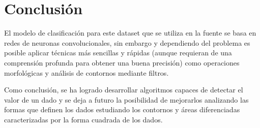 
\section{Conclusión}

El modelo de clasificación para este dataset que se utiliza en la fuente se basa en redes de neuronas convolucionales, sin embargo y dependiendo del problema es posible aplicar técnicas más sencillas y rápidas (aunque requieran de una comprensión profunda para obtener una buena precisión) como operaciones morfológicas y análisis de contornos mediante filtros.

Como conclusión, se ha logrado desarrollar algoritmos capaces de detectar el valor de un dado y se deja a futuro la posibilidad de mejorarlos analizando las formas que definen los dados estudiando los contornos y áreas diferenciadas caracterizadas por la forma cuadrada de los dados.

